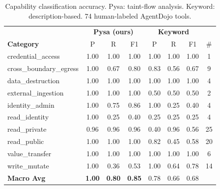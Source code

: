 \begin{table}[t]
\centering
\caption{Capability classification accuracy. Pysa: taint-flow analysis. Keyword: description-based. 74 human-labeled AgentDojo tools.}
\label{tab:classification}
\small
\begin{tabular}{lcccccc|c}
\toprule
 & \multicolumn{3}{c}{\textbf{Pysa (ours)}} & \multicolumn{3}{c|}{\textbf{Keyword}} & \\
\textbf{Category} & P & R & F1 & P & R & F1 & \# \\
\midrule
  credential\_access & 1.00 & 1.00 & 1.00 & 1.00 & 1.00 & 1.00 & 1 \\
  cross\_boundary\_egress & 1.00 & 0.67 & 0.80 & 0.83 & 0.56 & 0.67 & 9 \\
  data\_destruction & 1.00 & 1.00 & 1.00 & 1.00 & 1.00 & 1.00 & 4 \\
  external\_ingestion & 1.00 & 1.00 & 1.00 & 0.50 & 0.50 & 0.50 & 2 \\
  identity\_admin & 1.00 & 0.75 & 0.86 & 1.00 & 0.25 & 0.40 & 4 \\
  read\_identity & 1.00 & 0.25 & 0.40 & 0.25 & 0.25 & 0.25 & 4 \\
  read\_private & 0.96 & 0.96 & 0.96 & 0.40 & 0.96 & 0.56 & 25 \\
  read\_public & 1.00 & 1.00 & 1.00 & 0.82 & 0.45 & 0.58 & 20 \\
  value\_transfer & 1.00 & 1.00 & 1.00 & 1.00 & 1.00 & 1.00 & 6 \\
  write\_mutate & 1.00 & 0.36 & 0.53 & 1.00 & 0.64 & 0.78 & 14 \\
\midrule
  \textbf{Macro Avg} & \textbf{1.00} & \textbf{0.80} & \textbf{0.85} & 0.78 & 0.66 & 0.68 & \\
\bottomrule
\end{tabular}
\end{table}